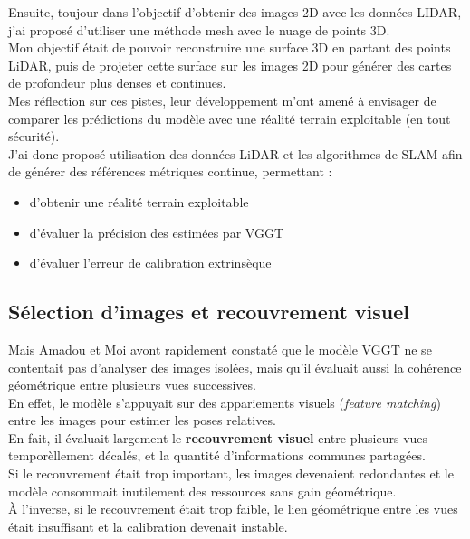 \documentclass[12pt,a4paper,oneside]{report}
\begin{document}
\hspace*{.5cm} Ensuite, toujour dans l'objectif d'obtenir des images 2D avec les données LIDAR, j'ai proposé d'utiliser une méthode mesh avec le nuage de points 3D. \\
Mon objectif était de pouvoir reconstruire une surface 3D en partant des points LiDAR, puis de projeter cette surface sur les images 2D pour générer des cartes de profondeur plus denses et continues.\\

\hspace*{.5cm} Mes réflection sur ces pistes, leur développement m'ont amené à envisager de comparer les prédictions du modèle avec une réalité terrain exploitable (en tout sécurité).\\
J'ai donc proposé utilisation des données LiDAR et les algorithmes de SLAM afin de générer des références métriques continue, permettant : 
\begin{itemize}[label=\textbullet]
    \item d'obtenir une réalité terrain exploitable
    \item d'évaluer la précision des estimées par VGGT
    \item d'évaluer l'erreur de calibration extrinsèque
\end{itemize}

\newpage

\subsection{Sélection d'images et recouvrement visuel}

\hspace*{.5cm} Mais Amadou et Moi avont rapidement constaté que le modèle VGGT ne se contentait pas d'analyser des images isolées, mais qu'il évaluait aussi la cohérence géométrique entre plusieurs vues successives.\\
En effet, le modèle s'appuyait sur des appariements visuels (\textit{feature matching}) entre les images pour estimer les poses relatives.\\
\hspace*{1cm}En fait, il évaluait largement le \textbf{recouvrement visuel} entre plusieurs vues temporèllement décalés, et la quantité d'informations communes partagées.\\

Si le recouvrement était trop important, les images devenaient redondantes et le modèle consommait inutilement des ressources sans gain géométrique. \\
\hspace*{.3cm} À l'inverse, si le recouvrement était trop faible, le lien géométrique entre les vues était insuffisant et la calibration devenait instable.
\end{document}
